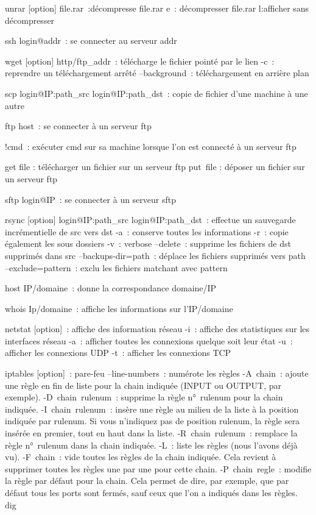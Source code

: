 \documentclass[a4paper, 10pt, onecolumn, openright, oneside]{book}
\begin{document}
{{unrar [option] file.rar :décompresse file.rar
e : décompresser file.rar
l:afficher sans décompresser

ssh login@addr : se connecter au serveur addr

wget [option] http/ftp_addr : télécharge le fichier pointé par le lien
-c : reprendre un téléchargement arrêté
--background : téléchargement en arrière plan

scp login@IP:path_src login@IP:path_dst : copie de fichier d’une machine à une autre

ftp host : se connecter à un serveur ftp

!cmd : exécuter cmd sur sa machine lorsque l’on est connecté à un serveur ftp

get file : télécharger un fichier sur un serveur ftp
put file : déposer un fichier sur un serveur ftp

sftp login@IP : se connecter à un serveur sftp

rsync [option] login@IP:path_src login@IP:path_dst : effectue un sauvegarde incrémentielle de src vers dst
-a : conserve toutes les informations
-r : copie également les sous dossiers
-v : verbose
--delete : supprime les fichiers de dst supprimés dans src
--backups-dir=path : déplace les fichiers supprimés vers path
--exclude=pattern : exclu les fichiers matchant avec pattern

host IP/domaine : donne la correspondance domaine/IP

whois Ip/domaine : affiche les informations sur l’IP/domaine

netstat [option] : affiche des information réseau
-i : affiche des statistiques sur les interfaces réseau
-a : afficher toutes les connexions quelque soit leur état
-u : afficher les connexions UDP
-t : afficher les connexions TCP
 
iptables [option] : pare-feu
--line-numbers : numérote les règles
-A chain : ajoute une règle en fin de liste pour la chain indiquée (INPUT ou OUTPUT, par exemple).
-D chain rulenum : supprime la règle n° rulenum pour la chain indiquée.
-I chain rulenum : insère une règle au milieu de la liste à la position indiquée par rulenum. Si vous n'indiquez pas de position rulenum, la règle sera insérée en premier, tout en haut dans la liste.
-R chain rulenum : remplace la règle n° rulenum dans la chain indiquée.
-L : liste les règles (nous l'avons déjà vu).
-F chain : vide toutes les règles de la chain indiquée. Cela revient à supprimer toutes les règles une par une pour cette chain.
-P chain regle : modifie la règle par défaut pour la chain. Cela permet de dire, par exemple, que par défaut tous les ports sont fermés, sauf ceux que l'on a indiqués dans les règles.
dig

}}
\end{document}
